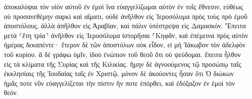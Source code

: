 \documentclass{openreader}
\begin{document}
ἀποκαλύψαι τὸν υἱὸν αὐτοῦ ἐν ἐμοὶ ἵνα εὐαγγελίζωμαι αὐτὸν ἐν τοῖς ἔθνεσιν, εὐθέως οὐ προσανεθέμην σαρκὶ καὶ αἵματι, 
οὐδὲ ἀνῆλθον εἰς Ἱεροσόλυμα πρὸς τοὺς πρὸ ἐμοῦ ἀποστόλους, ἀλλὰ ἀπῆλθον εἰς Ἀραβίαν, καὶ πάλιν ὑπέστρεψα εἰς Δαμασκόν. 
Ἔπειτα μετὰ ⸂ἔτη τρία⸃ ἀνῆλθον εἰς Ἱεροσόλυμα ἱστορῆσαι ⸀Κηφᾶν, καὶ ἐπέμεινα πρὸς αὐτὸν ἡμέρας δεκαπέντε· 
ἕτερον δὲ τῶν ἀποστόλων οὐκ εἶδον, εἰ μὴ Ἰάκωβον τὸν ἀδελφὸν τοῦ κυρίου. 
ἃ δὲ γράφω ὑμῖν, ἰδοὺ ἐνώπιον τοῦ θεοῦ ὅτι οὐ ψεύδομαι. 
ἔπειτα ἦλθον εἰς τὰ κλίματα τῆς Συρίας καὶ τῆς Κιλικίας. 
ἤμην δὲ ἀγνοούμενος τῷ προσώπῳ ταῖς ἐκκλησίαις τῆς Ἰουδαίας ταῖς ἐν Χριστῷ, 
μόνον δὲ ἀκούοντες ἦσαν ὅτι Ὁ διώκων ἡμᾶς ποτε νῦν εὐαγγελίζεται τὴν πίστιν ἥν ποτε ἐπόρθει, 
καὶ ἐδόξαζον ἐν ἐμοὶ τὸν θεόν. 
\end{document}
